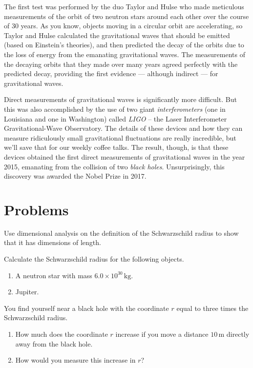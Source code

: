 The first test was performed by the duo Taylor and Hulse who made
meticulous measurements of the orbit of two neutron stars around each
other over the course of 30 years.  As you know, objects moving in a
circular orbit are accelerating, so Taylor and Hulse calculated the
gravitational waves that should be emitted (based on Einstein's
theories), and then predicted the decay of the orbits due to the loss
of energy from the emanating gravitational waves.  The measurements of
the decaying orbits that they made over many years agreed perfectly
with the predicted decay, providing the first evidence --- although
indirect --- for gravitational waves.

Direct measurements of gravitational waves is significantly more
difficult.  But this was also accomplished by the use of two giant
\emph{interferometers} (one in Louisiana and one in Washington)
called \emph{LIGO} -- the Laser Interferometer Gravitational-Wave
Observatory.  The details of these devices and how they can measure
ridiculously small gravitational fluctuations are really incredible,
but we'll save that for our weekly coffee talks. The result, though,
is that these devices obtained the first direct measurements of
gravitational waves in the year 2015, emanating from the collision of
two \emph{black holes}.  Unsurprisingly, this discovery was awarded the
Nobel Prize in 2017.

     

\section*{Problems}

\begin{exercise}
Use dimensional analysis on the definition of the Schwarzschild radius to
show that it has dimensions of length. 
\label{prob:Schwarzschild_dimensions}
\end{exercise}


\begin{exercise}
Calculate the Schwarzschild radius for the following objects.
\begin{enumerate}
\item A neutron star with mass $6.0\times 10^{30}\,\text{kg}$.
\item Jupiter.
\end{enumerate}
\label{prob:Schwarzschild_radius}
\end{exercise}


\begin{exercise}
You find yourself near a black hole with the coordinate $r$ equal to 
three times the Schwarzschild radius.
\begin{enumerate}
\item How much does the coordinate $r$ increase if you move a distance
$10\,\text{m}$ directly away from the black hole.
\item How would you measure this increase in $r$?
\end{enumerate}
\label{prob:Schwarzschild_distance}
\end{exercise}

